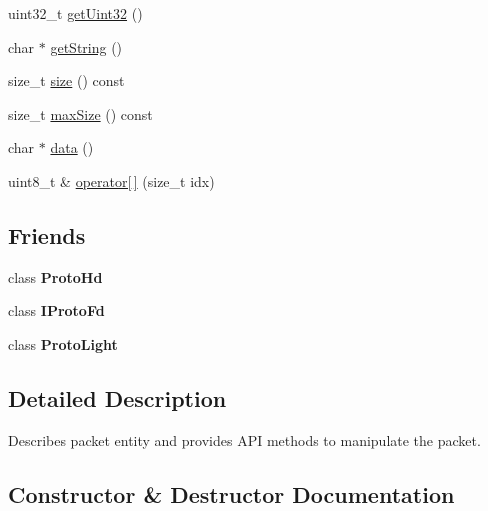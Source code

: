 \begin{DoxyCompactItemize}
uint32\+\_\+t \hyperlink{classTiny_1_1IPacket_a0a0d3758ca0f61e3eee9d20a7142de8d}{get\+Uint32} ()
\item 
char $\ast$ \hyperlink{classTiny_1_1IPacket_ac6e6a22ce9a652954491a8d4db081d79}{get\+String} ()
\item 
size\+\_\+t \hyperlink{classTiny_1_1IPacket_a76b6389f0d47b67c8428c58c2b09df51}{size} () const
\item 
size\+\_\+t \hyperlink{classTiny_1_1IPacket_a0a448d8efe2b6db3ee826f23b184b395}{max\+Size} () const
\item 
char $\ast$ \hyperlink{classTiny_1_1IPacket_aedf2ba31c5a29e3829458bd9f03a7051}{data} ()
\item 
uint8\+\_\+t \& \hyperlink{classTiny_1_1IPacket_aa1d796806e21d1c72a1fc12d2f6db592}{operator\mbox{[}$\,$\mbox{]}} (size\+\_\+t idx)
\end{DoxyCompactItemize}
\subsection*{Friends}
\begin{DoxyCompactItemize}
\item 
\mbox{\label{classTiny_1_1IPacket_a7f90e063a34c3417ed1ea25e64608857}} 
class {\bfseries Proto\+Hd}
\item 
\mbox{\label{classTiny_1_1IPacket_acb64e0550d8886dc8b8b5f1393667578}} 
class {\bfseries I\+Proto\+Fd}
\item 
\mbox{\label{classTiny_1_1IPacket_a1d317236f2a79fa559d5a9112e555882}} 
class {\bfseries Proto\+Light}
\end{DoxyCompactItemize}


\subsection{Detailed Description}
Describes packet entity and provides A\+PI methods to manipulate the packet. 

\subsection{Constructor \& Destructor Documentation}
\mbox{\label{classTiny_1_1IPacket_af44b18c4c8481475d40d8b87a6cb38ff}} 
